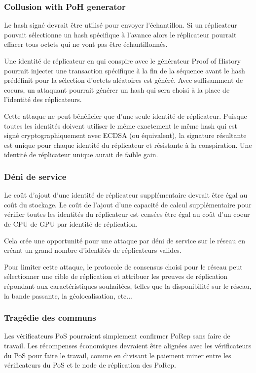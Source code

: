 \documentclass[12pt]{article}
\begin{document}
\subsubsection{Collusion with PoH generator}

Le hash signé devrait être utilisé pour envoyer l'échantillon. Si un réplicateur pouvait sélectionne un hash spécifique à l'avance alors le réplicateur pourrait effacer tous octets qui ne vont pas être échantillonnés.

Une identité de réplicateur en qui conspire avec le générateur Proof of History pourrait injecter une transaction spécifique à la fin de la séquence avant le hash prédéfinit pour la sélection d'octets aléatoires est généré. Avec suffisamment de coeurs, un attaquant pourrait générer un hash qui sera choisi à la place de l’identité des réplicateurs.

Cette attaque ne peut bénéficier que d'une seule identité de réplicateur. Puisque toutes les identités doivent utiliser le même exactement le même hash qui est signé cryptographiquement avec ECDSA (ou équivalent), la signature résultante est unique pour chaque identité du réplicateur et résistante à la conspiration. Une identité de réplicateur unique aurait de faible gain.
\subsubsection{Déni de service}
Le coût d'ajout d'une identité de réplicateur supplémentaire devrait être égal au coût du stockage. Le coût de l'ajout d'une capacité de calcul supplémentaire pour vérifier toutes les identités du réplicateur est censées être égal au coût d'un coeur de CPU de GPU par identité de réplication.

Cela crée une opportunité pour une attaque par déni de service sur le réseau en créant un grand nombre d'identités de réplicateurs valides.

Pour limiter cette attaque, le protocole de consensus choisi pour le réseau peut sélectionner une cible de réplication et attribuer les preuves de réplication répondant aux caractéristiques souhaitées, telles que la disponibilité sur le réseau, la bande passante, la géolocalisation,
etc...
\subsubsection{Tragédie des communs}

Les vérificateurs PoS pourraient simplement confirmer PoRep sans faire de travail. Les récompenses économiques devraient être alignées avec les vérificateurs du PoS pour faire le travail, comme en divisant le paiement miner entre les vérificateurs du PoS et le node de réplication des PoRep.
\end{document}
